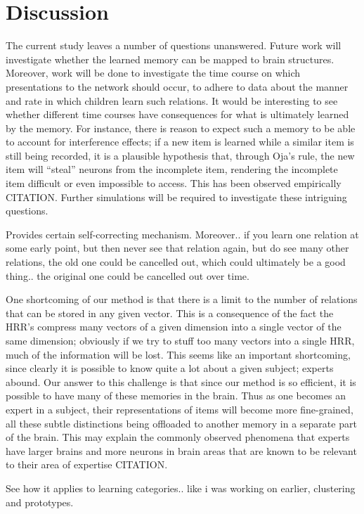 \documentclass[10pt,letterpaper]{article}
\begin{document}
\section{Discussion}
The current study leaves a number of questions unanswered. Future work will investigate whether the learned memory can be mapped to brain structures. Moreover, work will be done to investigate the time course on which presentations to the network should occur, to adhere to data about the manner and rate in which children learn such relations. It would be interesting to see whether different time courses have consequences for what is ultimately learned by the memory. For instance, there is reason to expect such a memory to be able to account for interference effects; if a new item is learned while a similar item is still being recorded, it is a plausible hypothesis that, through Oja's rule, the new item will ``steal'' neurons from the incomplete item, rendering the incomplete item difficult or even impossible to access. This has been observed empirically CITATION. Further simulations will be required to investigate these intriguing questions.

Provides certain self-correcting mechanism.
Moreover.. if you learn one relation at some early point, but then never see that relation again, but do see many other relations, the old one could be cancelled out, which could ultimately be a good thing.. the original one could be cancelled out over time.

One shortcoming of our method is that there is a limit to the number of relations that can be stored in any given vector. This is a consequence of the fact the HRR's compress many vectors of a given dimension into a single vector of the same dimension; obviously if we try to stuff too many vectors into a single HRR, much of the information will be lost. This seems like an important shortcoming, since clearly it is possible to know quite a lot about a given subject; experts abound. Our answer to this challenge is that since our method is so efficient, it is possible to have many of these memories in the brain. Thus as one becomes an expert in a subject, their representations of items will become more fine-grained, all these subtle distinctions being offloaded to another memory in a separate part of the brain. This may explain the commonly observed phenomena that experts have larger brains and more neurons in brain areas that are known to be relevant to their area of expertise CITATION.

See how it applies to learning categories.. like i was working on earlier, clustering and prototypes.
\end{document}
